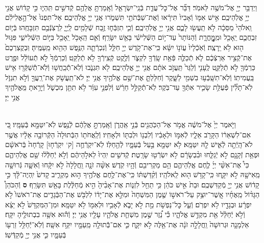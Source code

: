 \documentclass[twoside, openany, parskip=half, 11pt]{book}
\begin{document}
\begin{footnotesize}
\begin{multicols}{2}
\\
וַיְדַבֵּ֥ר יְיָ֖ אֶל־מֹשֶׁ֥ה לֵּאמֹֽר׃ דַּבֵּ֞ר אֶל־כׇּל־עֲדַ֧ת בְּֿנֵֽי־יִשְׂרָאֵ֛ל וְֿאָֽמַרְתָּ֥ אֲלֵהֶ֖ם קְֿדשִׁ֣ים תִּֽהְי֑וּ כִּ֣י קָד֔וֹשׁ אֲנִ֖י יְיָ֥ אֱלֹֽהֵיכֶֽם׃ אִ֣ישׁ אִמּ֤וֹ וְֿאָבִיו֙ תִּירָ֔אוּ וְֿאֶת־שַׁבְּֿתֹתַ֖י תִּשְׁמֹ֑רוּ אֲנִ֖י יְיָ֥ אֱלֹֽהֵיכֶֽם׃ אַל־תִּפְנוּ֙ אֶל־הָ֣אֱלִילִ֔ם וֵֽאלֹהֵי֙ מַסֵּכָ֔ה לֹ֥א תַֽעֲשׂ֖וּ לָכֶ֑ם אֲנִ֖י יְיָ֥ אֱלֹֽהֵיכֶֽם׃  וְֿכִ֧י תִזְבְּֿח֛וּ זֶ֥בַח שְֿׁלָמִ֖ים לַֽיְיָ֑ לִֽרְצֹֽנְֿכֶ֖ם תִּזְבָּחֻֽהוּ׃ בְּֿי֧וֹם זִבְחֲכֶ֛ם יֵֽאָכֵ֖ל וּמִֽמׇׇׇׇׇׇׇׇׇׇׇׇָּֽחֳרָ֑ת וְֿהַנּוֹתָר֙ עַד־י֣וֹם הַשְּֿׁלִישִׁ֔י בָּאֵ֖שׁ יִשָּׂרֵֽף׃ וְֿאִ֛ם הֵֽאָכֹ֥ל יֵֽאָכֵ֖ל בַּיּ֣וֹם הַשְּֿׁלִישִׁ֑י פִּגּ֥וּל ה֖וּא לֹ֥א יֵֽרָצֶֽה׃ וְֿאֹֽכְֿלָיו֙ עֲוֹנ֣וֹ יִשָּׂ֔א כִּֽי־אֶת־קֹ֥דֶשׁ יְיָ֖ חִלֵּ֑ל וְֿנִכְרְֿתָ֛ה הַנֶּ֥פֶשׁ הַהִ֖וא מֵֽעַמֶּֽיהָ׃ וּֽבְקֻצְרְכֶם֙ אֶת־קְֿצִ֣יר אַרְצְֿכֶ֔ם לֹ֧א תְֿכַלֶּ֛ה פְּֿאַ֥ת שָֽׂדְֿךָ֖ לִקְצֹ֑ר וְֿלֶ֥קֶט קְֿצִֽירְֿךָ֖ לֹ֥א תְֿלַקֵּֽט׃ וְֿכַרְמְֿךָ֙ לֹ֣א תְֿעוֹלֵ֔ל וּפֶ֥רֶט כַּרְמְֿךָ֖ לֹ֣א תְֿלַקֵּ֑ט לֶֽעָנִ֤י וְֿלַגֵּר֙ תַּֽעֲזֹ֣ב אֹתָ֔ם אֲנִ֖י יְיָ֥ אֱלֹֽהֵיכֶֽם׃  לֹ֖א תִּגְנֹ֑בוּ וְֿלֹֽא־תְֿֿכַֽחֲשׁ֥וּ וְֿלֹֽא־תְֿֿשַׁקְּֿר֖וּ אִ֥ישׁ בַּֽעֲמִיתֽוֹ׃ וְֿלֹֽא־תִשָּֽׁבְֿע֥וּ בִשְׁמִ֖י לַשָּׁ֑קֶר וְֿחִלַּלְתָּ֛ אֶת־שֵׁ֥ם אֱלֹהֶ֖יךָ אֲנִ֥י יְיָ׃ לֹא־תַֽעֲשֹׁ֥ק אֶת־רֵֽעֲךָ֖ וְֿלֹ֣א תִגְזֹ֑ל לֹֽא־תָלִ֞ין פְּֿעֻלַּ֥ת שָׂכִ֛יר אִתְּֿךָ֖ עַד־בֹּֽקֶר׃ לֹֽא־תְֿֿקַלֵּ֣ל חֵרֵ֔שׁ וְֿלִפְנֵ֣י עִוֵּ֔ר לֹ֥א תִתֵּ֖ן מִכְשֹׁ֑ל וְֿיָרֵ֥אתָ מֵּֽאֱלֹהֶ֖יךָ אֲנִ֥י יְיָ׃

\\
וַיֹּ֤אמֶר יְיָ֙ אֶל־מֹשֶׁ֔ה אֱמֹ֥ר אֶל־הַכֹּֽהֲנִ֖ים בְּֿנֵ֣י אַֽהֲרֹ֑ן וְֿאָֽמַרְתָּ֣ אֲלֵהֶ֔ם לְֿנֶ֥פֶשׁ לֹֽא־יִטַּמָּ֖א בְּֿעַמָּֽיו׃ כִּ֚י אִם־לִשְׁאֵר֔וֹ הַקָּרֹ֖ב אֵלָ֑יו לְֿאִמּ֣וֹ וּלְאָבִ֔יו וְֿלִבְנ֥וֹ וּלְבִתּ֖וֹ וּלְאָחִֽיו׃ וְֿלַֽאֲחֹת֤וֹ הַבְּֿתוּלָה֙ הַקְּֿרוֹבָ֣ה אֵלָ֔יו אֲשֶׁ֥ר לֹא־הָֽיְֿתָ֖ה לְֿאִ֑ישׁ לָ֖הּ יִטַּמָּֽא׃ לֹ֥א יִטַּמָּ֖א בַּ֣עַל בְּֿעַמָּ֑יו לְֿהֵ֖חַלּֽוֹ׃ לֹֽא־יִקְרְֿחֻ֤ה [ק‘ יִקְרְֿח֤וּ] קָרְֿחָה֙ בְּֿרֹאשָׁ֔ם וּפְאַ֥ת זְֿקָנָ֖ם לֹ֣א יְֿגַלֵּ֑חוּ וּבִ֨בְשָׂרָ֔ם לֹ֥א יִשְׂרְֿט֖וּ שָׂרָֽטֶת׃ קְֿדשִׁ֤ים יִֽהְיוּ֙ לֵאלֹ֣הֵיהֶ֔ם וְֿלֹ֣א יְֿחַלְּֿל֔וּ שֵׁ֖ם אֱלֹֽהֵיהֶ֑ם כִּי֩ אֶת־אִשֵּׁ֨י יְיָ֜ לֶ֧חֶם אֱלֹֽהֵיהֶ֛ם הֵ֥ם מַקְרִיבִ֖ם וְֿהָ֥יוּ קֹֽדֶשׁ׃  אִשָּׁ֨ה זֹנָ֤ה וַֽחֲלָלָה֙ לֹ֣א יִקָּ֔חוּ וְֿאִשָּׁ֛ה גְּֿרוּשָׁ֥ה מֵֽאִישָׁ֖הּ לֹ֣א יִקָּ֑חוּ כִּֽי־קָדֹ֥שׁ ה֖וּא לֵֽאלֹהָֽיו׃ וְֿקִ֨דַּשְׁתּ֔וֹ כִּֽי־אֶת־לֶ֥חֶם אֱלֹהֶ֖יךָ ה֣וּא מַקְרִ֑יב קָדשׁ֙ יִֽהְיֶה־לָּ֔ךְ כִּ֣י קָד֔וֹשׁ אֲנִ֥י יְיָ֖ מְֿקַדִּשְׁכֶֽם׃ וּבַת֙ אִ֣ישׁ כֹּהֵ֔ן כִּ֥י תֵחֵ֖ל לִזְנ֑וֹת אֶת־אָבִ֨יהָ֙ הִ֣יא מְֿחַלֶּ֔לֶת בָּאֵ֖שׁ תִּשָּׂרֵֽף׃ \textbf{ס} וְֿהַכֹּהֵן֩ הַגָּד֨וֹל מֵֽאֶחָ֜יו אֲֽשֶׁר־יוּצַ֥ק עַל־רֹאשׁ֣וֹ שֶׁ֤מֶן הַמִּשְׁחָה֙ וּמִלֵּ֣א אֶת־יָד֔וֹ לִלְבֹּ֖שׁ אֶת־הַבְּֿגָדִ֑ים אֶת־רֹאשׁוֹ֙ לֹ֣א יִפְרָ֔ע וּבְגָדָ֖יו לֹ֥א יִפְרֹֽם׃ וְֿעַ֛ל כׇּל־נַפְשֹׁ֥ת מֵ֖ת לֹ֣א יָבֹ֑א לְֿאָבִ֥יו וּלְאִמּ֖וֹ לֹ֥א יִטַּמָּֽא׃ וּמִן־הַמִּקְדָּשׁ֙ לֹ֣א יֵצֵ֔א וְֿלֹ֣א יְֿחַלֵּ֔ל אֵ֖ת מִקְדַּ֣שׁ אֱלֹהָ֑יו כִּ֡י נֵ֠זֶר שֶׁ֣מֶן מִשְׁחַ֧ת אֱלֹהָ֛יו עָלָ֖יו אֲנִ֥י יְיָ׃  וְֿה֕וּא אִשָּׁ֥ה בִבְתוּלֶ֖יהָ יִקָּֽח׃ אַלְמָנָ֤ה וּגְרוּשָׁה֙ וַֽחֲלָלָ֣ה זֹנָ֔ה אֶת־אֵ֖לֶּה לֹ֣א יִקָּ֑ח כִּ֛י אִם־בְּֿֿתוּלָ֥ה מֵֽעַמָּ֖יו יִקַּ֥ח אִשָּֽׁה׃ וְֿלֹֽא־יְֿֿחַלֵּ֥ל זַרְע֖וֹ בְּֿעַמָּ֑יו כִּ֛י אֲנִ֥י יְיָ֖ מְֿקַדְּֿשֽׁוֹ׃


\end{multicols}
\end{footnotesize}
\end{document}

